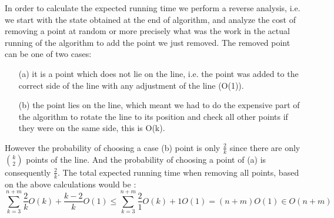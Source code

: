 In order to calculate the expected running time we perform a reverse analysis, i.e. we start with the state obtained at the end of algorithm, and analyze the cost of removing a point at random or more precisely what was the work in the actual running of the algorithm to add the point we just removed. The removed point can be
one of two cases: \begin{enumerate}
	\item[(a)] it is a point which does not lie on the line, i.e. the point was added
to the correct side of the line with any adjustment of the line (O(1)).
\item[(b)] the point lies on the line, which meant we had to do the expensive part of the algorithm
to rotate the line to its position and check all other points if they were on the same side, this
is O(k).
\end{enumerate}
However the probability of choosing a case (b) point is only $\frac{2}{k}$ since there are only
$\binom{k}{2}$ points of the line. And the probability of choosing a point of (a) is consequently $\frac{2}{k}$. The total expected running time when removing all points, based on the above calculations would be : $$\sum^{n+m}_{k=3}{\frac{2}{k}O(k)+\frac{k-2}{k}O(1)}\leq\sum^{n+m}_{k=3}{\frac{2}{1}O(k)+1O(1)}=(n+m)O(1)\in O(n+m)$$